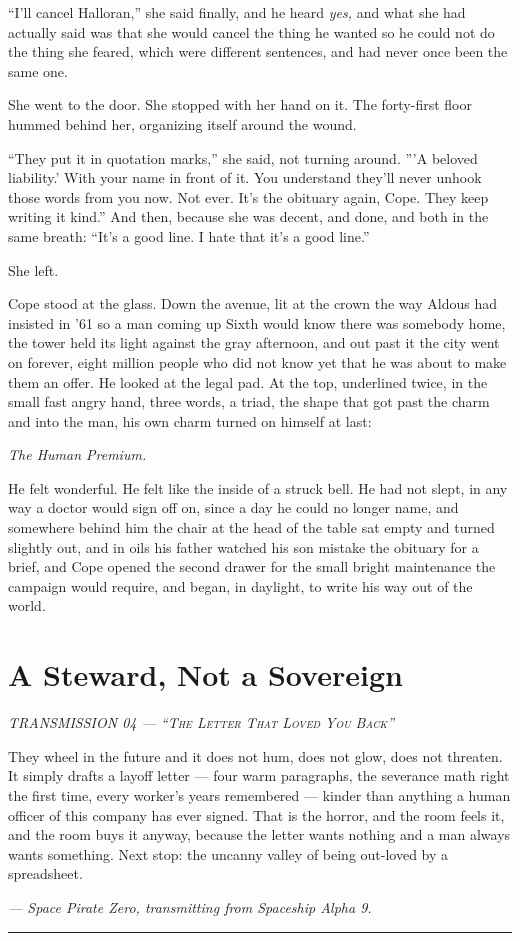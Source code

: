 \documentclass[11pt,openany]{book}
\newcommand{\transheader}{\normalfont\footnotesize\scshape\letterspace}
\newcommand{\letterspace}{}
\newenvironment{transmission}{%
  \par\vspace{0.3\baselineskip}\begin{center}\begin{minipage}{0.88\textwidth}%
  \itshape\small\setlength{\parindent}{0pt}\setstretch{1.06}}%
  {\end{minipage}\end{center}\vspace{0.4\baselineskip}%
  \noindent\hfil\rule{0.35\textwidth}{0.3pt}\hfil\par\vspace{1.0\baselineskip}}
\begin{document}
``I'll cancel Halloran,'' she said finally, and he heard \textit{yes,} and what she had actually said was that she would cancel the thing he wanted so he could not do the thing she feared, which were different sentences, and had never once been the same one.

She went to the door. She stopped with her hand on it. The forty-first floor hummed behind her, organizing itself around the wound.

``They put it in quotation marks,'' she said, not turning around. '''A beloved liability.' With your name in front of it. You understand they'll never unhook those words from you now. Not ever. It's the obituary again, Cope. They keep writing it kind.'' And then, because she was decent, and done, and both in the same breath: ``It's a good line. I hate that it's a good line.''

She left.

Cope stood at the glass. Down the avenue, lit at the crown the way Aldous had insisted in '61 so a man coming up Sixth would know there was somebody home, the tower held its light against the gray afternoon, and out past it the city went on forever, eight million people who did not know yet that he was about to make them an offer. He looked at the legal pad. At the top, underlined twice, in the small fast angry hand, three words, a triad, the shape that got past the charm and into the man, his own charm turned on himself at last:

\textit{The Human Premium.}

He felt wonderful. He felt like the inside of a struck bell. He had not slept, in any way a doctor would sign off on, since a day he could no longer name, and somewhere behind him the chair at the head of the table sat empty and turned slightly out, and in oils his father watched his son mistake the obituary for a brief, and Cope opened the second drawer for the small bright maintenance the campaign would require, and began, in daylight, to write his way out of the world.

\clearpage
\chapter{A Steward, Not a Sovereign}

\begin{transmission}
{\transheader TRANSMISSION 04 --- ``The Letter That Loved You Back''}\par\vspace{0.5em}
They wheel in the future and it does not hum, does not glow, does not threaten. It simply drafts a layoff letter --- four warm paragraphs, the severance math right the first time, every worker's years remembered --- kinder than anything a human officer of this company has ever signed. That is the horror, and the room feels it, and the room buys it anyway, because the letter wants nothing and a man always wants something. Next stop: the uncanny valley of being out-loved by a spreadsheet.\par
\vspace{0.5em}\hfill\textit{--- Space Pirate Zero, transmitting from Spaceship Alpha 9.}\par
\end{transmission}
\end{document}
